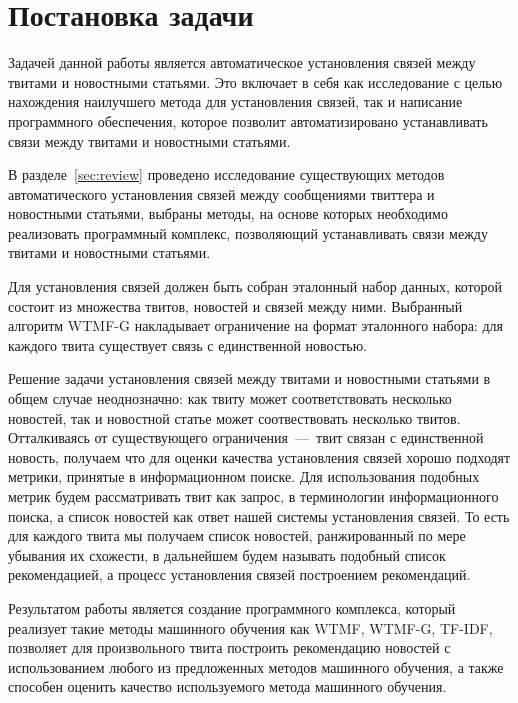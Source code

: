 
\section{Постановка задачи}

    Задачей данной работы является автоматическое установления связей между твитами и новостными статьями.
    Это включает в себя как исследование с целью нахождения наилучшего метода для установления связей, так и написание программного обеспечения,
    которое позволит автоматизировано устанавливать связи между твитами и новостными статьями.

    В разделе~\ref{sec:review} проведено исследование существующих методов автоматического установления связей между сообщениями твиттера и новостными статьями,
     выбраны методы, на основе которых необходимо реализовать программный комплекс, позволяющий устанавливать связи между твитами и новостными статьями.

    Для установления связей должен быть собран эталонный набор данных, которой состоит из множества твитов, новостей и связей между ними. Выбранный алгоритм WTMF-G накладывает ограничение на формат эталонного набора: для каждого твита существует связь с единственной новостью.

    Решение задачи установления связей между твитами и новостными статьями в общем случае неоднозначно:
    как твиту может соответствовать несколько новостей, так и новостной статье может соотвествовать несколько твитов.
    Отталкиваясь от существующего ограничения~---~твит связан с единственной новость, получаем что для оценки качества установления связей хорошо подходят метрики, принятые в информационном поиске.
    Для использования подобных метрик будем рассматривать твит как запрос, в терминологии информационного поиска, а список новостей как ответ нашей системы установления связей. То есть для каждого твита мы получаем список новостей, ранжированный по мере убывания их схожести, в дальнейшем будем называть подобный список рекомендацией, а процесс установления связей построением рекомендаций.

    Результатом работы является создание программного комплекса, который реализует такие методы машинного обучения как WTMF, WTMF-G, TF-IDF,
    позволяет для произвольного твита построить рекомендацию новостей с использованием любого из предложенных методов машинного обучения,
    а также способен оценить качество используемого метода машинного обучения.